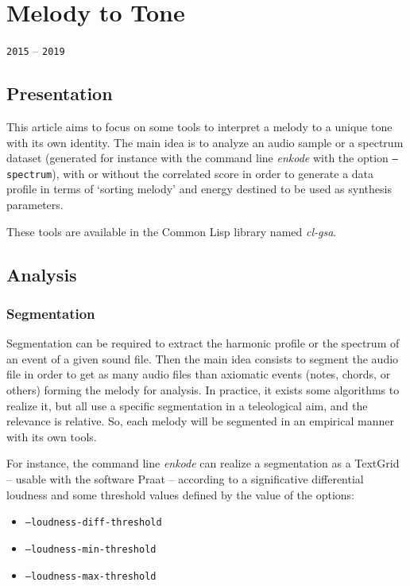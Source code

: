\chapter{Melody to Tone}
\thispagestyle{empty}

\label{m2t}

{\texttt{2015} -- \texttt{2019}}

\bigskip
\smallskip

\section{Presentation}

This article aims to focus on some tools to interpret a melody to a unique tone with its own identity. The main idea is to analyze an audio sample or a spectrum dataset (generated for instance with the command line \textsl{enkode} with the option \texttt{--spectrum}), with or without the correlated score in order to generate a data profile in terms of `sorting melody' and energy destined to be used as synthesis parameters.

These tools are available in the Common Lisp library named \textsl{cl-gsa}.

\section{Analysis}

\subsection{Segmentation}

Segmentation can be required to extract the harmonic profile or the spectrum of an event of a given sound file. Then the main idea consists to segment the audio file in order to get as many audio files than axiomatic events (notes, chords, or others) forming the melody for analysis.
In practice, it exists some algorithms to realize it, but all use a specific segmentation in a teleological aim, and the relevance is relative. So, each melody will be segmented in an empirical manner with its own tools.

For instance, the command line \textsl{enkode} can realize a segmentation as a TextGrid -- usable with the software Praat -- according to a significative differential loudness and some threshold values defined by the value of the options:
\begin{itemize}
  \item \texttt{--loudness-diff-threshold}
  \item \texttt{--loudness-min-threshold}
  \item \texttt{--loudness-max-threshold}
\end{itemize}


